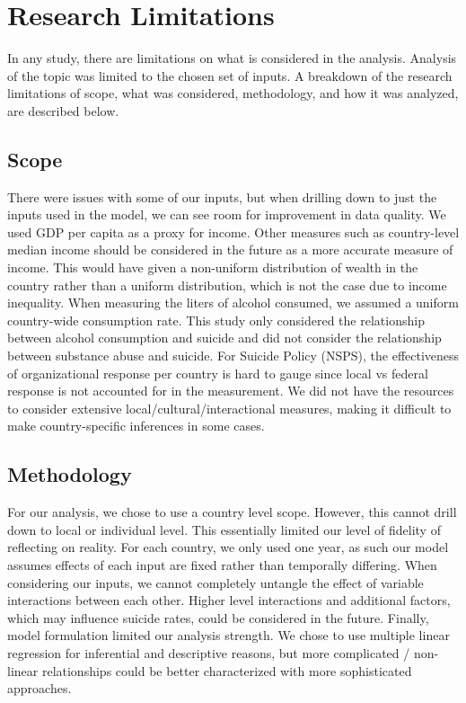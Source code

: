 \documentclass[]{article}
\begin{document}
\section{Research Limitations}\label{research-limitations}

In any study, there are limitations on what is considered in the
analysis. Analysis of the topic was limited to the chosen set of inputs.
A breakdown of the research limitations of scope, what was considered,
methodology, and how it was analyzed, are described below.

\subsection{Scope}\label{scope}

There were issues with some of our inputs, but when drilling down to
just the inputs used in the model, we can see room for improvement in
data quality. We used GDP per capita as a proxy for income. Other
measures such as country-level median income should be considered in the
future as a more accurate measure of income. This would have given a
non-uniform distribution of wealth in the country rather than a uniform
distribution, which is not the case due to income inequality. When
measuring the liters of alcohol consumed, we assumed a uniform
country-wide consumption rate. This study only considered the
relationship between alcohol consumption and suicide and did not
consider the relationship between substance abuse and suicide. For
Suicide Policy (NSPS), the effectiveness of organizational response per
country is hard to gauge since local vs federal response is not
accounted for in the measurement. We did not have the resources to
consider extensive local/cultural/interactional measures, making it
difficult to make country-specific inferences in some cases.

\subsection{Methodology}\label{methodology}

For our analysis, we chose to use a country level scope. However, this
cannot drill down to local or individual level. This essentially limited
our level of fidelity of reflecting on reality. For each country, we
only used one year, as such our model assumes effects of each input are
fixed rather than temporally differing. When considering our inputs, we
cannot completely untangle the effect of variable interactions between
each other. Higher level interactions and additional factors, which may
influence suicide rates, could be considered in the future. Finally,
model formulation limited our analysis strength. We chose to use
multiple linear regression for inferential and descriptive reasons, but
more complicated / non-linear relationships could be better
characterized with more sophisticated approaches.
\end{document}
